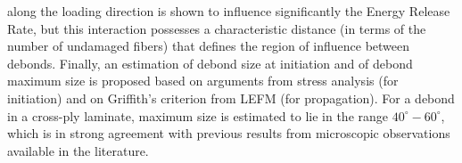 along the loading direction is shown to influence significantly the Energy Release Rate, but this interaction possesses a characteristic distance (in terms of the number of undamaged fibers) that defines the region of influence between debonds. Finally, an estimation of debond size at initiation and of debond maximum size is proposed based on arguments from stress analysis (for initiation) and on Griffith's criterion from LEFM (for propagation). For a debond in a cross-ply laminate, maximum size is estimated to lie in the range $40^{\circ}-60^{\circ}$, which is in strong agreement with previous results from microscopic observations available in the literature.
